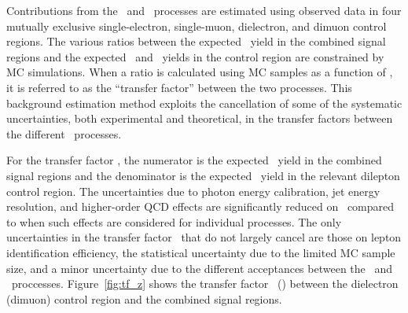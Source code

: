 Contributions from the \zinvg\ and \wlng\ processes are estimated using observed data in four mutually exclusive single-electron, single-muon, dielectron, and dimuon control regions.
The various ratios between the expected \zinvg\ yield in the combined signal regions and the expected \wlng\ and \zllg\ yields in the control region are constrained by MC simulations.
When a ratio is calculated using MC samples as a function of \ETg, it is referred to as the ``transfer factor'' between the two processes.
This background estimation method exploits the cancellation of some of the systematic uncertainties, both experimental and theoretical, in the transfer factors between the different  \vg\ processes.
 
For the transfer factor \RZll, the numerator is the expected \zinvg\ yield in the combined signal regions and the denominator is the expected \zllg\ yield in the relevant dilepton control region.
The uncertainties due to photon energy calibration, jet energy resolution, and higher-order QCD effects are significantly reduced on \RZll\ compared to when such effects are considered for individual processes. 
The only uncertainties in the transfer factor \RZll\ that do not largely cancel are those on lepton identification efficiency, the statistical uncertainty due to the limited MC sample size, and a minor uncertainty due to the different acceptances between the \zinvg\ and \zllg\ proccesses. 
Figure~\ref{fig:tf_z} shows the transfer factor \RZee\ (\RZmm) between the dielectron (dimuon) control region and the combined signal regions.

